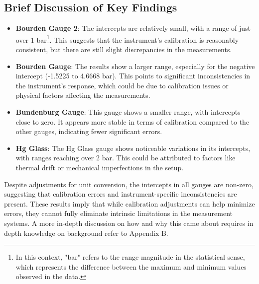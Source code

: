 \documentclass{article}
\begin{document}
\subsection{Brief Discussion of Key Findings}

\begin{itemize}
	\item \textbf{Bourden Gauge 2}: The intercepts are relatively small, with a range of just over 1 bar\footnote{In this context, "bar" refers to the range magnitude in the statistical sense, which represents the difference between the maximum and minimum values observed in the data.}. This suggests that the instrument's calibration is reasonably consistent, but there are still slight discrepancies in the measurements.
	
	\item \textbf{Bourden Gauge}: The results show a larger range, especially for the negative intercept (-1.5225 to 4.6668 bar). This points to significant inconsistencies in the instrument's response, which could be due to calibration issues or physical factors affecting the measurements.
	
	\item \textbf{Bundenburg Gauge}: This gauge shows a smaller range, with intercepts close to zero. It appears more stable in terms of calibration compared to the other gauges, indicating fewer significant errors.
	
	\item \textbf{Hg Glass}: The Hg Glass gauge shows noticeable variations in its intercepts, with ranges reaching over 2 bar. This could be attributed to factors like thermal drift or mechanical imperfections in the setup.
\end{itemize}
Despite adjustments for unit conversion, the intercepts in all gauges are non-zero, suggesting that calibration errors and instrument-specific inconsistencies are present. These results imply that while calibration adjustments can help minimize errors, they cannot fully eliminate intrinsic limitations in the measurement systems. A more in-depth discussion on how and why this came about requires in depth knowledge on background refer to Appendix B.

\newpage
\end{document}
